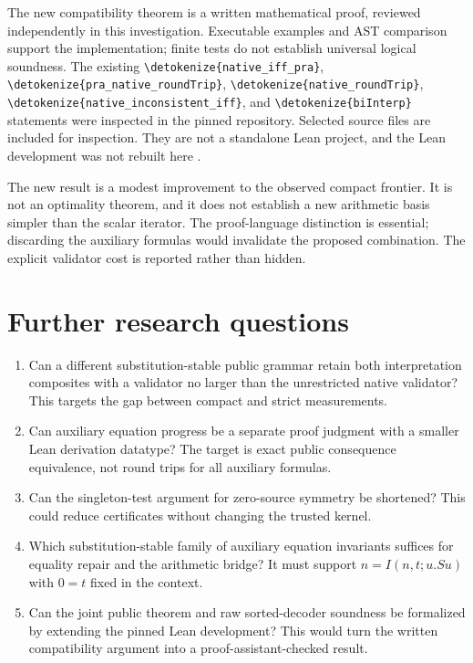 \documentclass[11pt,letterpaper]{article}
\theoremstyle{definition}\newtheorem{definition}[theorem]{Definition}
\theoremstyle{remark}\newtheorem{remark}[theorem]{Remark}
\newcommand{\file}[1]{\expandafter\nolinkurl\expandafter{\detokenize{#1}}}
\begin{document}
The new compatibility theorem is a written mathematical proof, reviewed
independently in this investigation. Executable examples and AST comparison
support the implementation; finite tests do not establish universal logical
soundness. The existing \file{native_iff_pra},
\file{pra_native_roundTrip}, \file{native_roundTrip},
\file{native_inconsistent_iff}, and \file{biInterp} statements were inspected
in the pinned repository. Selected source files are included for inspection.
They are not a standalone Lean project, and the Lean development was not
rebuilt here \cite{lean-native,lean-bi}.

The new result is a modest improvement to the observed compact frontier.
It is not an optimality theorem, and it does not establish a new arithmetic
basis simpler than the scalar iterator. The proof-language distinction is
essential; discarding the auxiliary formulas would invalidate the proposed
combination. The explicit validator cost is reported rather than hidden.

\section{Further research questions}

\begin{enumerate}
\item Can a different substitution-stable public grammar retain both
interpretation composites with a validator no larger than the unrestricted
native validator? This targets the gap between compact and strict measurements.
\item Can auxiliary equation progress be a separate proof judgment with a
smaller Lean derivation datatype? The target is exact public consequence
equivalence, not round trips for all auxiliary formulas.
\item Can the singleton-test argument for zero-source symmetry be shortened?
This could reduce certificates without changing the trusted kernel.
\item Which substitution-stable family of auxiliary equation invariants
suffices for equality repair and the arithmetic bridge? It must support
$n=I(n,t;u.Su)$ with $0=t$ fixed in the context.
\item Can the joint public theorem and raw sorted-decoder soundness be
formalized by extending the pinned Lean development? This would turn the
written compatibility argument into a proof-assistant-checked result.
\end{enumerate}
\end{document}

